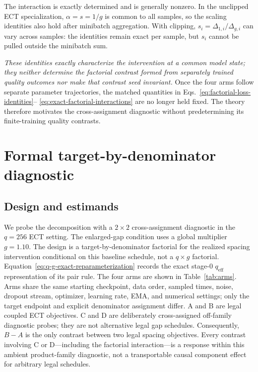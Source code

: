 \documentclass{article}
\begin{document}
The interaction is exactly determined and is generally nonzero. In the
unclipped ECT specialization, $\alpha=s=1/g$ is common to all samples, so the
scaling identities also hold after minibatch aggregation. With clipping,
$s_i=\Delta_{1,i}/\Delta_{g,i}$ can vary across samples: the identities remain
exact per sample, but $s_i$ cannot be pulled outside the minibatch sum.

\emph{These identities exactly characterize the intervention at a common model
state; they neither determine the factorial contrast formed from separately
trained quality outcomes nor make that contrast seed invariant.}
Once the four arms follow separate parameter trajectories, the matched
quantities in Eqs.~\eqref{eq:factorial-loss-identities}--
\eqref{eq:exact-factorial-interactions} are no longer held fixed. The theory
therefore motivates the cross-assignment diagnostic without predetermining its
finite-training quality contrasts.

\section{Formal target-by-denominator diagnostic}
\label{sec:factorial-experiment}

\subsection{Design and estimands}

We probe the decomposition with a $2\times2$ cross-assignment diagnostic in the $q=256$
ECT setting. The enlarged-gap condition uses a global multiplier $g=1.10$.
The design is a target-by-denominator factorial for the realized spacing
intervention conditional on this baseline schedule, not a $q\times g$
factorial. Equation~\eqref{eq:q-g-exact-reparameterization} records the exact
stage-0 $q_{\mathrm{eff}}$ representation of its pair rule.
The four arms are shown in Table~\ref{tab:arms}. Arms share the same starting
checkpoint, data order, sampled times, noise, dropout stream, optimizer,
learning rate, EMA, and numerical settings; only the target endpoint and
explicit denominator assignment differ. A and B are legal coupled ECT
objectives. C and D are deliberately cross-assigned off-family diagnostic
probes; they are not alternative legal gap schedules.
Consequently, $B-A$ is the only contrast between two legal spacing objectives.
Every contrast involving C or D---including the factorial interaction---is a
response within this ambient product-family diagnostic, not a transportable
causal component effect for arbitrary legal schedules.
\end{document}
